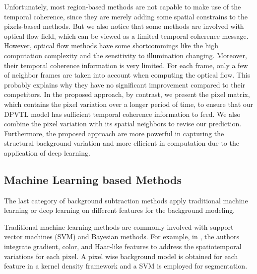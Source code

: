 \documentclass[journal]{IEEEtran}
\begin{document}
Unfortunately, most region-based methods are not capable to make use of the temporal coherence, since they are merely adding some spatial constrains to the pixels-based methods. 
But we also notice that some methods are involved with optical flow field, which can be viewed as a limited temporal coherence message. 
However, optical flow methods have some shortcommings like the high computation complexity and the sensitivity to illumination changing. 
Moreover, their temporal coherence information is very limited. For each frame, only a few of neighbor frames are taken into account when computing the optical flow.
This probably explains why they have no significant improvement compared to their competitors.    
In the proposed approach, by contrast, we present the pixel matrix, which contains the pixel variation over a longer period of time, to ensure that our DPVTL model has sufficient temporal coherence information to feed.
We also combine the pixel variation with its spatial neighbors to revise our prediction.
Furthermore, the proposed approach are more powerful in capturing the structural background variation and more efficient in computation due to the application of deep learning.


\subsection{Machine Learning based Methods}
The last category of background subtraction methods apply traditional machine learning or deep learning on different features for the background modeling.

Traditional machine learning methods are commonly involved with support vector machines (SVM) and Bayesian methods\cite{Zhang2014Statis}. For example, in \cite{Han2012}, the authors integrate gradient, color, and Haar-like features to address the spatiotemporal variations for each pixel. A pixel wise background model is obtained for each feature in a kernel density framework and a SVM is employed for segmentation.
\end{document}
